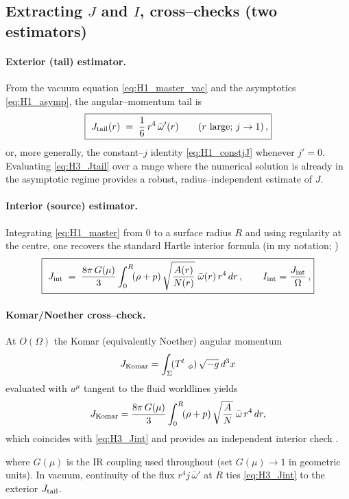 \documentclass{iopjournal}
\begin{document}
\subsection{\texorpdfstring{Extracting $J$ and $I$, cross–checks (two estimators)}{Extracting J and I, cross-checks (two estimators)}}\label{app:H3}
\paragraph{Exterior (tail) estimator.}
From the vacuum equation \eqref{eq:H1_master_vac} and the asymptotics \eqref{eq:H1_asymp}, the angular–momentum tail is
\begin{equation}
\boxed{\
J_{\rm tail}(r)\;=\;\frac{1}{6}\,r^{4}\,\bar\omega'(r)\qquad (r\ \text{large;\ }j\to1)\,,
}
\label{eq:H3_Jtail}
\end{equation}
or, more generally, the constant–$j$ identity \eqref{eq:H1_constjJ} whenever $j'=0$. Evaluating \eqref{eq:H3_Jtail} over a range where the numerical solution is already in the asymptotic regime provides a robust, radius–independent estimate of $J$.

\paragraph{Interior (source) estimator.}
Integrating \eqref{eq:H1_master} from $0$ to a surface radius $R$ and using regularity at the centre, one recovers the standard Hartle interior formula (in my notation; \cite{Hartle1967,HartleThorne1968,PoissonWill2014})
\begin{equation}
\boxed{\
J_{\rm int}\;=\;\frac{8\pi\,G(\mu)}{3}\int_{0}^{R}\!(\rho+p)\,\sqrt{\frac{A(r)}{N(r)}}\;\bar\omega(r)\,r^{4}\,dr\,,\qquad
I_{\rm int}=\frac{J_{\rm int}}{\Omega}\,,
}
\label{eq:H3_Jint}
\end{equation}
\paragraph{Komar/Noether cross–check.}
At $O(\Omega)$ the Komar (equivalently Noether) angular momentum
\[
J_{\rm Komar}=\int_{\Sigma}\!(T^{t}{}_{\ \phi})\,\sqrt{-g}\,d^{3}x
\]
evaluated with $u^{\mu}$ tangent to the fluid worldlines yields
\[
J_{\rm Komar}
=\frac{8\pi\,G(\mu)}{3}\int_{0}^{R}\!(\rho+p)\,\sqrt{\frac{A}{N}}\;\bar\omega\,r^{4}\,dr,
\]
which coincides with \eqref{eq:H3_Jint} and provides an independent interior check \cite{Hartle1967,HartleThorne1968,PoissonWill2014}.

where $G(\mu)$ is the IR coupling used throughout (set $G(\mu)\!\to\!1$ in geometric units). In vacuum, continuity of the flux $r^{4}j\,\bar\omega'$ at $R$ ties \eqref{eq:H3_Jint} to the exterior $J_{\rm tail}$.
\end{document}
